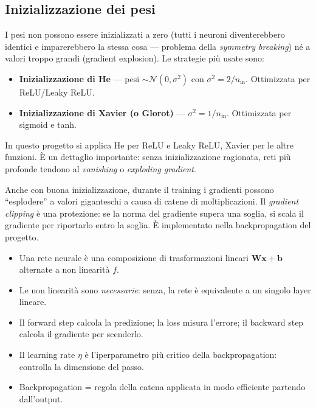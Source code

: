 \documentclass[11pt,a4paper]{article}
\begin{document}
\subsection{Inizializzazione dei pesi}

I pesi non possono essere inizializzati a zero (tutti i neuroni
diventerebbero identici e imparerebbero la stessa cosa --- problema della
\emph{symmetry breaking}) né a valori troppo grandi (gradient explosion).
Le strategie più usate sono:

\begin{itemize}
    \item \textbf{Inizializzazione di He} --- pesi $\sim \mathcal{N}(0,
          \sigma^2)$ con $\sigma^2 = 2/n_{\text{in}}$. Ottimizzata per
          ReLU/Leaky ReLU.
    \item \textbf{Inizializzazione di Xavier (o Glorot)} --- $\sigma^2 =
          1/n_{\text{in}}$. Ottimizzata per sigmoid e tanh.
\end{itemize}

In questo progetto si applica He per ReLU e Leaky ReLU, Xavier per le
altre funzioni. È un dettaglio importante: senza inizializzazione
ragionata, reti più profonde tendono al \emph{vanishing} o
\emph{exploding gradient}.

\begin{concetto}
Anche con buona inizializzazione, durante il training i gradienti possono
``esplodere'' a valori giganteschi a causa di catene di moltiplicazioni.
Il \emph{gradient clipping} è una protezione: se la norma del gradiente
supera una soglia, si scala il gradiente per riportarlo entro la soglia.
È implementato nella backpropagation del progetto.
\end{concetto}

\begin{riassunto}
\begin{itemize}
    \item Una rete neurale è una composizione di trasformazioni lineari $\bm{W}\bm{x}+\bm{b}$ alternate a non linearità $f$.
    \item Le non linearità sono \emph{necessarie}: senza, la rete è equivalente a un singolo layer lineare.
    \item Il forward step calcola la predizione; la loss misura l'errore; il backward step calcola il gradiente per scenderlo.
    \item Il learning rate $\eta$ è l'iperparametro più critico della backpropagation: controlla la dimensione del passo.
    \item Backpropagation = regola della catena applicata in modo efficiente partendo dall'output.
\end{itemize}
\end{riassunto}
\end{document}
